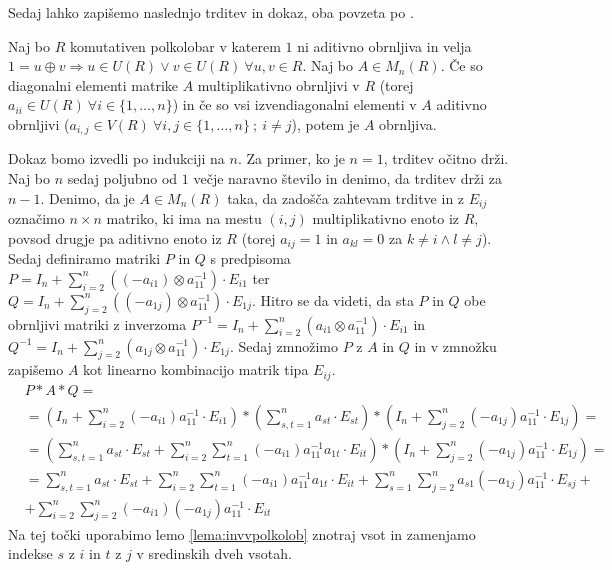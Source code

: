 \documentclass[mat1]{fmfdelo}
\begin{document}
Sedaj lahko zapišemo naslednjo trditev in dokaz, oba povzeta po \cite[lema 2.\ 3.]{bib:Tanbase}.

\begin{trditev}\label{trd:obrnljMatr}
	Naj bo $R$ komutativen polkolobar v katerem $1$ ni aditivno obrnljiva in velja $1 = u \oplus v \Rightarrow u\in U(R) \lor v\in U(R)~\forall u, v \in R$. Naj bo $A\in M_n(R)$. Če so diagonalni elementi matrike $A$ multiplikativno obrnljivi v $R$ (torej $a_{ii}\in U(R)~\forall i \in \{1, \ldots, n\}$) in če so vsi izvendiagonalni elementi v $A$ aditivno obrnljivi ($a_{i,j}\in V(R)~\forall i, j\in \{1, \ldots, n\} ~;~i\neq j$), potem je $A$ obrnljiva.
\end{trditev}

\begin{dokaz}
	Dokaz bomo izvedli po indukciji na $n$. Za primer, ko je $n = 1$, trditev očitno drži. Naj bo $n$ sedaj poljubno od $1$ večje naravno število in denimo, da trditev drži za $n-1$. Denimo, da je $A\in M_n(R)$ taka, da zadošča zahtevam trditve in z $E_{ij}$ označimo $n\times n$ matriko, ki ima na mestu $(i, j)$ multiplikativno enoto iz $R$, povsod drugje pa aditivno enoto iz $R$ (torej $a_{ij} = 1$ in $a_{kl} = 0$ za $k\neq i \land l\neq j$). Sedaj definiramo matriki $P$ in $Q$ s predpisoma $P = I_n + \sum_{i = 2}^{n}((-a_{i1})\otimes a_{11}^{-1})\cdot E_{i1}$ ter $Q = I_n + \sum_{j = 2}^{n}((-a_{1j})\otimes a_{11}^{-1})\cdot E_{1j}$. Hitro se da videti, da sta $P$ in $Q$ obe obrnljivi matriki z inverzoma $P^{-1} = I_n + \sum_{i = 2}^{n}(a_{i1}\otimes a_{11}^{-1})\cdot E_{i1}$ in $Q^{-1} =I_n + \sum_{j = 2}^{n}(a_{1j}\otimes a_{11}^{-1})\cdot E_{1j}$. Sedaj zmnožimo $P$ z $A$ in $Q$ in v zmnožku zapišemo $A$ kot linearno kombinacijo matrik tipa $E_{ij}$.
	\begin{align*}
		& P*A*Q = \\ 
		&= \left(I_n + \sum_{i = 2}^{n}(-a_{i1}) a_{11}^{-1}\cdot E_{i1}\right)*\left(\sum_{s, t = 1}^{n}a_{st}\cdot E_{st}\right)*\left(I_n + \sum_{j = 2}^{n}(-a_{1j})a_{11}^{-1}\cdot E_{1j}\right) = \\
		&=\left(\sum_{s, t = 1}^{n}a_{st}\cdot E_{st} + \sum_{i = 2}^{n}\sum_{t = 1}^{n} (-a_{i1})a_{11}^{-1}a_{1t}\cdot E_{it}\right)*\left(I_n + \sum_{j = 2}^{n}(-a_{1j})a_{11}^{-1}\cdot E_{1j}\right) = \\
		&= \sum_{s, t = 1}^{n}a_{st}\cdot E_{st} + \sum_{i = 2}^{n}\sum_{t = 1}^{n} (-a_{i1})a_{11}^{-1}a_{1t}\cdot E_{it} + \sum_{s = 1}^{n}\sum_{j = 2}^{n} a_{s1}(-a_{1j})a_{11}^{-1}\cdot E_{sj} + \\
		&+ \sum_{i = 2}^{n}\sum_{j=2}^{n} (-a_{i1})(-a_{1j})a_{11}^{-1}\cdot E_{it}
	\end{align*}
	Na tej točki uporabimo lemo \ref{lema:invvpolkolob} znotraj vsot in zamenjamo indekse $s$ z $i$ in $t$ z $j$ v sredinskih dveh vsotah.
	

\end{dokaz}
\end{document}
